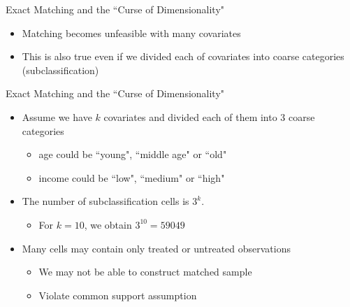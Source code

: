 \documentclass[dvipsnames,hyperref={pdfpagelabels=false}]{beamer}
\begin{document}
\begin{frame}{Exact Matching and the ``Curse of Dimensionality"}
	\begin{itemize}
		\item Matching becomes unfeasible with many covariates
		\vspace{0.2cm}
		\item This is also true even if we divided each of covariates into coarse categories (subclassification)
	\end{itemize}
\end{frame}


\begin{frame}{Exact Matching and the ``Curse of Dimensionality"}
	\begin{itemize}
		\item Assume we have $k$ covariates and divided each of them into 3 coarse categories 
		\vspace{0.2cm}
		\begin{itemize}
			\item age could be ``young", ``middle age" or ``old"
			\vspace{0.2cm}
			\item income could be ``low", ``medium" or ``high"
		\end{itemize}
		\vspace{0.2cm}
		\item The number of subclassification cells is $3^k$. 
		\begin{itemize}
			\vspace{0.2cm}
			\item For $k=10$, we obtain $3^{10}=59049$
		\end{itemize}
		\vspace{0.2cm}
		\item Many cells may contain only treated or untreated observations
		\vspace{0.2cm}
		\begin{itemize}
			\item We may not be able to construct matched sample
			\vspace{0.2cm}
			\item Violate common support assumption
		\end{itemize}
	\end{itemize}
\end{frame}
\end{document}
